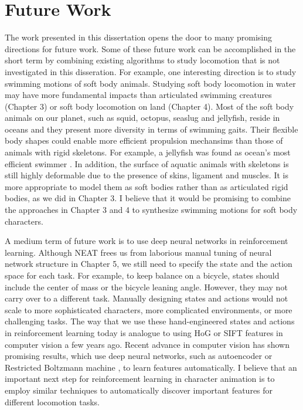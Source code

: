 \section{Future Work}

The work presented in this dissertation opens the door to many promising directions for future work. Some of these future work can be accomplished in the short term by combining existing algorithms to study locomotion that is not investigated in this disseration. For example, one interesting direction is to study swimming motions of soft body animals. Studying soft body locomotion in water may have more fundamental impacts than articulated swimming creatures (Chapter 3) or soft body locomotion on land (Chapter 4). Most of the soft body animals on our planet, such as squid, octopus, seaslug and jellyfish, reside in oceans and they present more diversity in terms of swimming gaits. Their flexible body shapes could enable more efficient propulsion mechansims than those of animals with rigid skeletons. For example, a jellyfish was found as ocean's most efficient swimmer \cite{Gemmell:2013}. In addition, the surface of aquatic animals with skeletons is still highly deformable due to the presence of skins, ligament and muscles. It is more appropriate to model them as soft bodies rather than as articulated rigid bodies, as we did in Chapter 3. I believe that it would be promising to combine the approaches in Chapter 3 and 4 to synthesize swimming motions for soft body characters.

A medium term of future work is to use deep neural networks in reinforcement learning. Although NEAT frees us from laborious manual tuning of neural network structure in Chapter 5, we still need to specify the state and the action space for each task. For example, to keep balance on a bicycle, states should include the center of mass or the bicycle leaning angle. However, they may not carry over to a different task. Manually designing states and actions would not scale to more sophisticated characters, more complicated environments, or more challenging tasks. The way that we use these hand-engineered states and actions in reinforcement learning today is analogue to using HoG or SIFT features in computer vision a few years ago. Recent advance in computer vision has shown promising results, which use deep neural networks, such as autoencoder \cite{Vincent:2008} or Restricted Boltzmann machine \cite{Hinton:2012}, to learn features automatically. I believe that an important next step for reinforcement learning in character animation is to employ similar techniques to automatically discover important features for different locomotion tasks.

